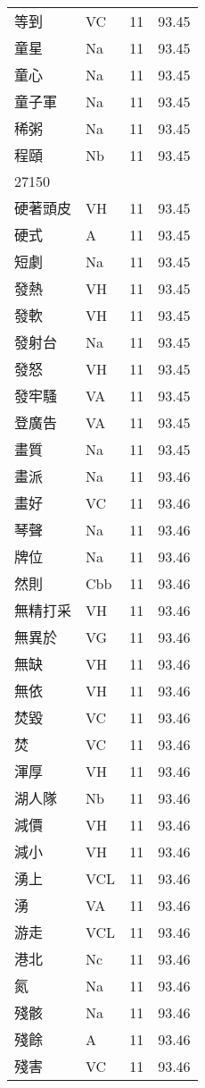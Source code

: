 \documentclass[twocolumn]{book}
\begin{document}
\begin{supertabular}{llrr}
等到 & VC & 11 &  93.45\\
童星 & Na & 11 &  93.45\\
童心 & Na & 11 &  93.45\\
童子軍 & Na & 11 &  93.45\\
稀粥 & Na & 11 &  93.45\\
程頤 & Nb & 11 &  93.45\\
27150\\
硬著頭皮 & VH & 11 &  93.45\\
硬式 & A & 11 &  93.45\\
短劇 & Na & 11 &  93.45\\
發熱 & VH & 11 &  93.45\\
發軟 & VH & 11 &  93.45\\
發射台 & Na & 11 &  93.45\\
發怒 & VH & 11 &  93.45\\
發牢騷 & VA & 11 &  93.45\\
登廣告 & VA & 11 &  93.45\\
畫質 & Na & 11 &  93.45\\
畫派 & Na & 11 &  93.46\\
畫好 & VC & 11 &  93.46\\
琴聲 & Na & 11 &  93.46\\
牌位 & Na & 11 &  93.46\\
然則 & Cbb & 11 &  93.46\\
無精打采 & VH & 11 &  93.46\\
無異於 & VG & 11 &  93.46\\
無缺 & VH & 11 &  93.46\\
無依 & VH & 11 &  93.46\\
焚毀 & VC & 11 &  93.46\\
焚 & VC & 11 &  93.46\\
渾厚 & VH & 11 &  93.46\\
湖人隊 & Nb & 11 &  93.46\\
減價 & VH & 11 &  93.46\\
減小 & VH & 11 &  93.46\\
湧上 & VCL & 11 &  93.46\\
湧 & VA & 11 &  93.46\\
游走 & VCL & 11 &  93.46\\
港北 & Nc & 11 &  93.46\\
氮 & Na & 11 &  93.46\\
殘骸 & Na & 11 &  93.46\\
殘餘 & A & 11 &  93.46\\
殘害 & VC & 11 &  93.46\\

\end{supertabular}
\end{document}
